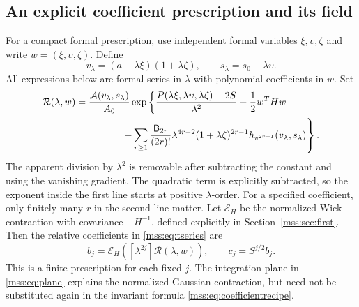 \documentclass[11pt,letterpaper]{article}
\numberwithin{equation}{section}
\theoremstyle{definition}\newtheorem{definition}[theorem]{Definition}
\theoremstyle{remark}\newtheorem{remark}[theorem]{Remark}
\begin{document}
\subsection{An explicit coefficient prescription and its field}
For a compact formal prescription, use independent formal variables $\xi,\upsilon,\zeta$ and write $w=(\xi,\upsilon,\zeta)$. Define
\begin{equation}\label{mss:eq:formalvs}
v_\lambda=(a+\lambda\xi)(1+\lambda\zeta),\qquad
s_\lambda=s_0+\lambda\upsilon.
\end{equation}
All expressions below are formal series in $\lambda$ with polynomial coefficients in $w$. Set
\begin{align}\label{mss:eq:formalseries}
\mathcal R(\lambda,w)
={}&\frac{\mathcal A(v_\lambda,s_\lambda)}{A_0}
\exp\left\{
\frac{P(\lambda\xi,\lambda\upsilon,\lambda\zeta)-2S}{\lambda^2}
-\frac12w^THw\right.\\
&\left.\hspace{12mm}
-\sum_{r\ge1}\frac{\mathsf B_{2r}}{(2r)!}
\lambda^{4r-2}(1+\lambda\zeta)^{2r-1}
 h_{v^{2r-1}}(v_\lambda,s_\lambda)
\right\}.\nonumber
\end{align}
The apparent division by $\lambda^2$ is removable after subtracting the constant and using the vanishing gradient. The quadratic term is explicitly subtracted, so the exponent inside the first line starts at positive $\lambda$-order. For a specified coefficient, only finitely many $r$ in the second line matter. Let $\mathcal E_H$ be the normalized Wick contraction with covariance $-H^{-1}$, defined explicitly in Section~\ref{mss:sec:first}. Then the relative coefficients in \eqref{mss:eq:tseries} are
\begin{equation}\label{mss:eq:coefficientrecipe}
b_j=\mathcal E_H\!\left([\lambda^{2j}]\mathcal R(\lambda,w)\right),
\qquad c_j=S^{j/2}b_j.
\end{equation}
This is a finite prescription for each fixed $j$. The integration plane in \eqref{mss:eq:plane} explains the normalized Gaussian contraction, but need not be substituted again in the invariant formula \eqref{mss:eq:coefficientrecipe}.
\end{document}
